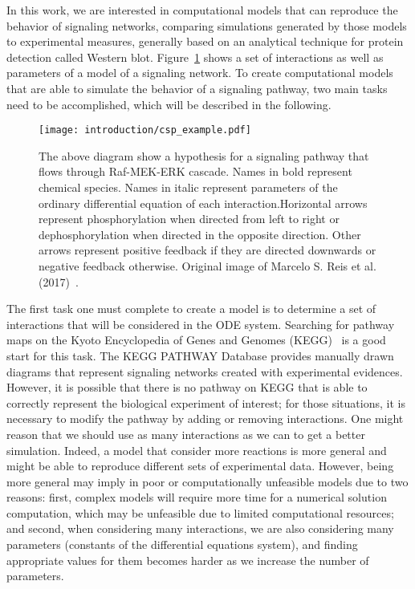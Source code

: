In this work, we are interested in computational models that can 
reproduce the behavior of signaling networks, comparing simulations
generated by those models to experimental measures, generally based on
an analytical technique for protein detection called 
Western blot. Figure~\ref{fig:signal_pathway_example} shows a
set of interactions as well as parameters of a model of a signaling 
network. To create computational models that are able to simulate the 
behavior of a signaling pathway, two main tasks need to be 
accomplished, which will be described in the following.

\begin{figure}[!ht]
\centering 
    \texttt{[image: introduction/csp\_example.pdf]}
\caption{The above diagram show a hypothesis for a signaling pathway 
    that flows through Raf-MEK-ERK cascade. Names in bold represent 
    chemical species. Names in italic represent parameters of the 
    ordinary differential equation of each interaction.Horizontal arrows
    represent phosphorylation when directed from left to right or 
    dephosphorylation when directed in the opposite direction. Other 
    arrows represent positive feedback if they are directed downwards or 
    negative feedback otherwise. Original image of Marcelo S. Reis et
    al. (2017)~\cite{Reis2017}.}
\label{fig:signal_pathway_example}
\end{figure}

The first task one must complete to create a model is to determine a set 
of interactions that will be considered in the ODE system. Searching for 
pathway maps on the Kyoto Encyclopedia of Genes and Genomes 
(KEGG)~\cite{Kanehisa2000kegg} is a good start for this task. The KEGG 
PATHWAY Database provides manually drawn diagrams that represent 
signaling networks created with experimental evidences. However, it is 
possible that there is no pathway on KEGG that is able to correctly 
represent the biological experiment of interest; for those situations, 
it is necessary to modify the pathway by adding or removing 
interactions. One might reason that we should use as many interactions 
as we can to get a better simulation. Indeed, a model that consider more
reactions is more general and might be able to reproduce different sets
of experimental data. However, being more general may imply in poor or 
computationally unfeasible models due to two reasons: first, 
complex models will require more time for a numerical solution 
computation, which may be unfeasible due to limited computational 
resources; and second, when considering many interactions, we are also 
considering many parameters (constants of the differential equations 
system), and finding appropriate values for them becomes harder as we 
increase the number of parameters.


